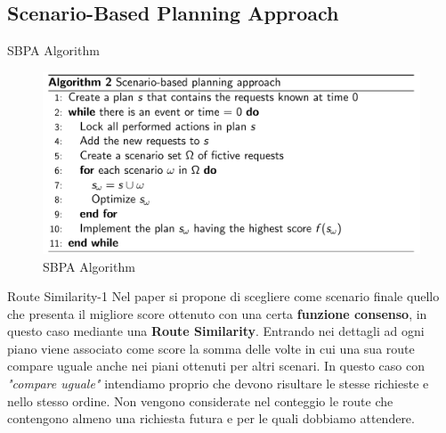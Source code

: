 \documentclass[10pt]{beamer}
\begin{document}
    \subsection{Scenario-Based Planning Approach}\label{sec:sbpa}
    \begin{frame}{SBPA Algorithm}
        \begin{figure}[h!]
                \centering
                \includegraphics[scale=0.25]{Images/SBPAAlgorithm.png}
                \caption{SBPA Algorithm}
                \label{fig:reoptimization}
            \end{figure}
    \end{frame}

    \begin{frame}{Route Similarity-1}
        Nel paper \cite{SBPPDVR} si propone di scegliere come scenario finale quello che presenta il migliore score ottenuto con una certa \textbf{funzione consenso}, in questo caso mediante una \textbf{Route Similarity}. \newline Entrando nei dettagli ad ogni piano viene associato come score la somma delle volte in cui una sua route compare uguale anche nei piani ottenuti per altri scenari. In questo caso con \textit{"compare uguale"} intendiamo proprio che devono risultare le stesse richieste e nello stesso ordine. Non vengono considerate nel conteggio le route che contengono almeno una richiesta futura e per le quali dobbiamo attendere.
    \end{frame}
\end{document}
